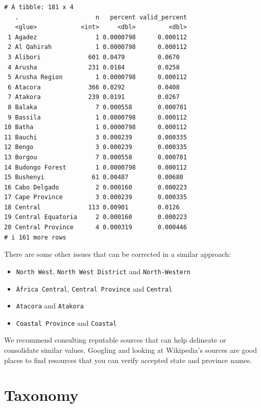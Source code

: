 \documentclass[
  letterpaper,
  DIV=11,
  numbers=noendperiod,
  oneside]{scrreprt}
\providecommand{\tightlist}{%
  \setlength{\itemsep}{0pt}\setlength{\parskip}{0pt}}\usepackage{longtable,booktabs,array}
\begin{document}
\begin{verbatim}
# A tibble: 181 x 4
   .                     n   percent valid_percent
   <glue>            <int>     <dbl>         <dbl>
 1 Agadez                1 0.0000798      0.000112
 2 Al Qahirah            1 0.0000798      0.000112
 3 Alibori             601 0.0479         0.0670  
 4 Arusha              231 0.0184         0.0258  
 5 Arusha Region         1 0.0000798      0.000112
 6 Atacora             366 0.0292         0.0408  
 7 Atakora             239 0.0191         0.0267  
 8 Balaka                7 0.000558       0.000781
 9 Bassila               1 0.0000798      0.000112
10 Batha                 1 0.0000798      0.000112
11 Bauchi                3 0.000239       0.000335
12 Bengo                 3 0.000239       0.000335
13 Borgou                7 0.000558       0.000781
14 Budongo Forest        1 0.0000798      0.000112
15 Bushenyi             61 0.00487        0.00680 
16 Cabo Delgado          2 0.000160       0.000223
17 Cape Province         3 0.000239       0.000335
18 Central             113 0.00901        0.0126  
19 Central Equatoria     2 0.000160       0.000223
20 Central Province      4 0.000319       0.000446
# i 161 more rows
\end{verbatim}

There are some other issues that can be corrected in a similar approach:

\begin{itemize}
\tightlist
\item
  \texttt{North\ West}, \texttt{North\ West\ District} and
  \texttt{North-Western}
\item
  \texttt{Àfrica\ Central}, \texttt{Central\ Province} and
  \texttt{Central}
\item
  \texttt{Atacora} and \texttt{Atakora}
\item
  \texttt{Coastal\ Province} and \texttt{Coastal}
\end{itemize}

We recommend consulting reputable sources that can help delineate or
consolidate similar values. Googling and looking at Wikipedia's sources
are good places to find resources that you can verify accepted state and
province names.


\hypertarget{sec-standardise-taxonomy}{%
\chapter{Taxonomy}\label{sec-standardise-taxonomy}}
\end{document}
